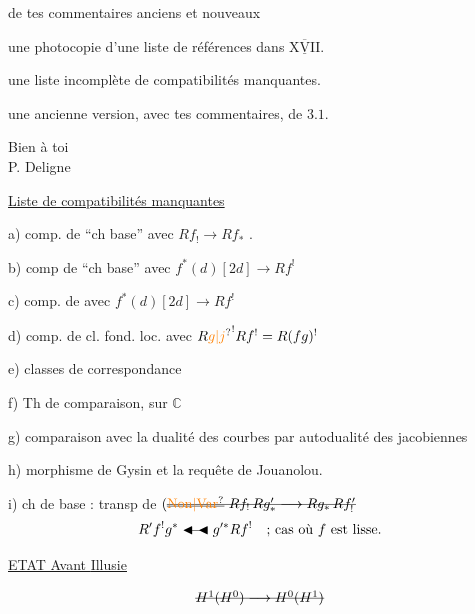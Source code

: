 de tes commentaires anciens et nouveaux

une photocopie d'une liste de références dans $\underline{\overline{\mathrm{XVII}}}$.

une liste incomplète de compatibilités manquantes.

une ancienne version, avec tes commentaires, de $3.1$.

Bien à toi\\
P. Deligne\\


\uline{Liste de compatibilités manquantes}

a) comp. de ``ch base'' avec $Rf_!\longrightarrow Rf_*$ . 

b) comp de ``ch base'' avec $f^*(d)[2d]\longrightarrow Rf^!$

c) comp. de  avec $f^*(d)[2d]\longrightarrow Rf^!$

d) comp. de cl. fond. loc. avec $R{\unsure{g|j}}^!Rf^!=R(fg)^!$

e) classes de correspondance

f) Th de comparaison, sur $\mathbb C$

g) comparaison avec la dualité des courbes par autodualité des jacobiennes

h) morphisme de Gysin et la requête de Jouanolou.

i) ch de base : transp de $(\deleted{\deleted{\unsure{\mathrm{Non}|\mathrm{Var}}}\ Rf_!\,Rg'_*\longrightarrow Rg_*\,Rf'_!}$
\[
R'f^!g^*\mathrel{\blacktriangleleft\mkern-4mu\relbar\mkern-4mu\blacktriangleleft}g'^*Rf^!\quad\text{; cas où }f\text{ est lisse.}
\]


\uline{ETAT Avant \uline{Illusie}}

\[
\deleted{H^1(H^0)\longrightarrow H^0(H^1)}
\]

